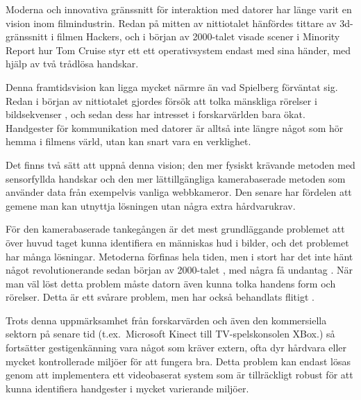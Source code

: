 \documentclass[../rapport_MVEX01-11-05]{subfiles}
\begin{document}
Moderna och innovativa gränssnitt för interaktion med datorer har länge varit
en vision inom filmindustrin. Redan på mitten av nittiotalet hänfördes
tittare av 3d-gränssnitt i filmen Hackers, och i början av 2000-talet visade
scener i Minority Report hur Tom Cruise styr ett ett operativsystem endast med
sina händer, med hjälp av två trådlösa handskar.

Denna framtidsvision kan
ligga mycket närmre än vad Spielberg förväntat sig. Redan i början av
nittiotalet gjordes försök att tolka mänskliga rörelser i bildsekvenser
\cite{Yamato92}, och sedan dess har intresset i forskarvärlden bara ökat.
Handgester för kommunikation med datorer är alltså inte längre något som
hör hemma i filmens värld, utan kan snart vara en verklighet.

Det finns två sätt att uppnå denna vision; den mer fysiskt krävande
metoden med sensorfyllda handskar och den mer lättillgängliga kamerabaserade
metoden som använder data från exempelvis vanliga webbkameror. Den senare har
fördelen att gemene man kan utnyttja lösningen utan några extra hårdvarukrav.

För den kamerabaserade tankegången är det mest grundläggande problemet att över huvud taget kunna identifiera en människas hud i bilder, och det
problemet har många lösningar. Metoderna förfinas hela tiden, men i stort har
det inte hänt något revolutionerande sedan början av 2000-talet
\cite{Sebe04,Kruppa02,Albiol01,Brand00}, med några få undantag
. När man väl löst detta problem måste datorn
även kunna tolka handens form och rörelser. Detta är ett svårare problem, men
har också behandlats flitigt \cite{Pavlovic97,Garg09,Nielsen04,Zabulis09}.


Trots denna uppmärksamhet från forskarvärden och även den kommersiella sektorn
på senare tid (t.ex.~Microsoft Kinect till TV-spelskonsolen XBox.) så fortsätter gestigenkänning vara något som
kräver extern, ofta dyr hårdvara eller mycket kontrollerade miljöer för att
fungera bra. Detta problem kan endast lösas genom att implementera ett
videobaserat system som är tillräckligt robust för att kunna identifiera
handgester i mycket varierande miljöer.
\end{document}
